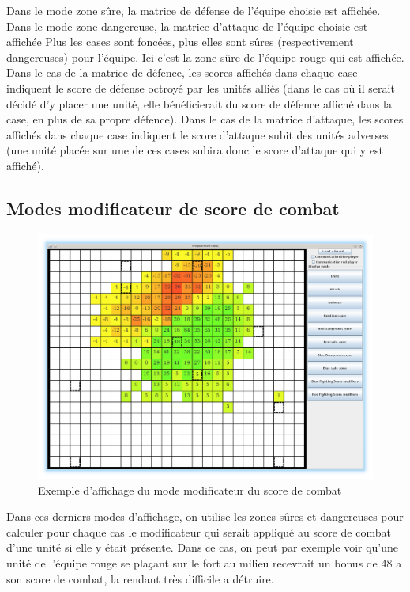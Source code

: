 			Dans le mode zone sûre, la matrice de défense de l'équipe choisie est affichée.
			Dans le mode zone dangereuse, la matrice d'attaque de l'équipe choisie est affichée
			Plus les cases sont foncées, plus elles sont sûres (respectivement dangereuses) pour l'équipe.
			Ici c'est la zone sûre de l'équipe rouge qui est affichée.
            Dans le cas de la matrice de défence, les scores affichés dans chaque case indiquent le score de défense octroyé par les unités alliés (dans le cas où il serait décidé d'y placer une unité, elle bénéficierait du score de défence affiché dans la case, en plus de sa propre défence).
            Dans le cas de la matrice d'attaque, les scores affichés dans chaque case indiquent le score d'attaque subit des unités adverses (une unité placée sur une de ces cases subira donc le score d'attaque qui y est affiché).

			\clearpage

		\subsection{Modes modificateur de score de combat}
			\begin{figure}[!h]
				\centerline{\includegraphics[scale=0.4]{images/screen_fsmod.png}}
				\caption{Exemple d'affichage du mode modificateur du score de combat}
			\end{figure}
			Dans ces derniers modes d'affichage, on utilise les zones sûres et dangereuses pour calculer pour chaque cas le modificateur
			qui serait appliqué au score de combat d'une unité si elle y était présente.
			Dans ce cas, on peut par exemple voir qu'une unité de l'équipe rouge se plaçant sur le fort au milieu recevrait un bonus de 48 a son score de combat, la rendant très difficile a détruire.

